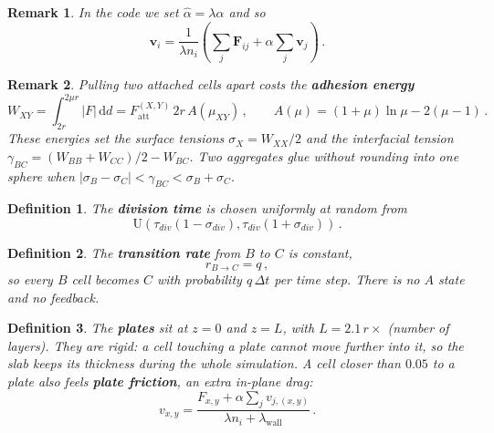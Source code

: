 \documentclass{article}
\newcommand {\diff}{\mathrm{d}}
\newtheorem{definition}{Definition}
\newtheorem{remark}{Remark}
\begin{document}
\begin{remark}
    In the code we set $\hat\alpha=\lambda\alpha$ and so
    \begin{equation*}
        {\mathbf{v}}_i = \frac{1}{{\lambda} n_i}\left( \sum_j {\mathbf{F}}_{ij} + \alpha \sum_j {\mathbf{v}}_j \right) \,.
    \end{equation*}
\end{remark}

\begin{remark}
    Pulling two attached cells apart costs the \textbf{adhesion energy}
    \begin{equation*}
        W_{XY} = \int_{2r}^{2\mu r} |F|\,\diff d = F_\text{att}^{(X,Y)}\, 2r\, A(\mu_{XY}) \,, \qquad A(\mu) = (1+\mu)\ln\mu - 2(\mu - 1) \,.
    \end{equation*}
    These energies set the surface tensions $\sigma_X = W_{XX}/2$ and the interfacial tension $\gamma_{BC} = (W_{BB} + W_{CC})/2 - W_{BC}$. Two aggregates glue without rounding into one sphere when $|\sigma_B - \sigma_C| < \gamma_{BC} < \sigma_B + \sigma_C$.
\end{remark}

\begin{definition}
    The \textbf{division time} is chosen uniformly at random from
    \begin{equation*}
        \text{U}\left(\tau_{div}(1-\sigma_{div}),\tau_{div}(1+\sigma_{div})\right) \,.
    \end{equation*}
\end{definition}

\begin{definition}
    The \textbf{transition rate} from $B$ to $C$ is constant,
    \begin{equation*}
        r_{B\rightarrow C} = q \,,
    \end{equation*}
    so every $B$ cell becomes $C$ with probability $q\,\Delta t$ per time step. There is no $A$ state and no feedback.
\end{definition}

\begin{definition}
    The \textbf{plates} sit at $z=0$ and $z=L$, with $L = 2.1\,r \times$ (number of layers). They are rigid: a cell touching a plate cannot move further into it, so the slab keeps its thickness during the whole simulation. A cell closer than $0.05$ to a plate also feels \textbf{plate friction}, an extra in-plane drag:
    \begin{equation*}
        v_{x,y} = \frac{F_{x,y} + \alpha \sum_j v_{j,(x,y)}}{\lambda n_i + \lambda_\text{wall}} \,.
    \end{equation*}
\end{definition}
\end{document}
